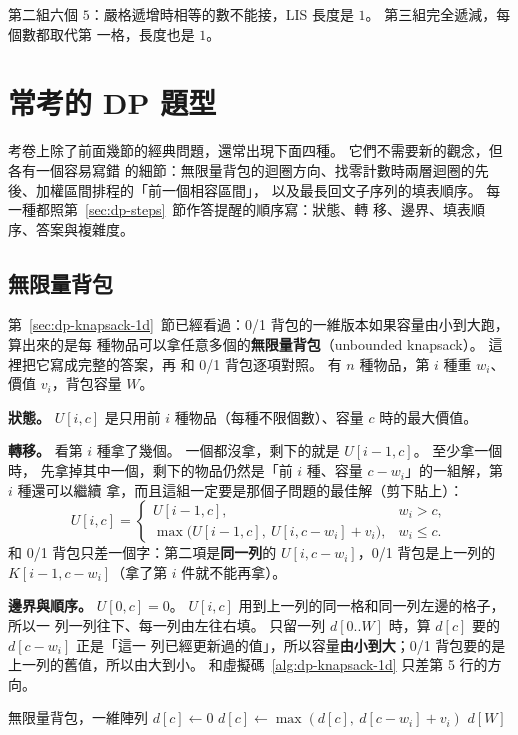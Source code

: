 第二組六個 $5$：嚴格遞增時相等的數不能接，LIS 長度是 $1$。 第三組完全遞減，每個數都取代第
一格，長度也是 $1$。

\section{常考的 DP 題型}
\label{sec:dp-classic}

考卷上除了前面幾節的經典問題，還常出現下面四種。 它們不需要新的觀念，但各有一個容易寫錯
的細節：無限量背包的迴圈方向、找零計數時兩層迴圈的先後、加權區間排程的「前一個相容區間」，
以及最長回文子序列的填表順序。 每一種都照第~\ref{sec:dp-steps}~節作答提醒的順序寫：狀態、轉
移、邊界、填表順序、答案與複雜度。

\subsection{無限量背包}
\label{sec:dp-unbounded}

第~\ref{sec:dp-knapsack-1d}~節已經看過：0/1 背包的一維版本如果容量由小到大跑，算出來的是每
種物品可以拿任意多個的\textbf{無限量背包}（unbounded knapsack）。 這裡把它寫成完整的答案，再
和 0/1 背包逐項對照。 有 $n$ 種物品，第 $i$ 種重 $w_i$、價值 $v_i$，背包容量 $W$。

\textbf{狀態。} $U[i, c]$ 是只用前 $i$ 種物品（每種不限個數）、容量 $c$ 時的最大價值。

\textbf{轉移。} 看第 $i$ 種拿了幾個。 一個都沒拿，剩下的就是 $U[i - 1, c]$。 至少拿一個時，
先拿掉其中一個，剩下的物品仍然是「前 $i$ 種、容量 $c - w_i$」的一組解，第 $i$ 種還可以繼續
拿，而且這組一定要是那個子問題的最佳解（剪下貼上）：
\[
U[i, c] = \begin{cases}
U[i - 1, c], & w_i > c, \\
\max\bigl(U[i - 1, c],\ U[i, c - w_i] + v_i\bigr), & w_i \le c .
\end{cases}
\]
和 0/1 背包只差一個字：第二項是\textbf{同一列}的 $U[i, c - w_i]$，0/1 背包是上一列的
$K[i - 1, c - w_i]$（拿了第 $i$ 件就不能再拿）。

\textbf{邊界與順序。} $U[0, c] = 0$。 $U[i, c]$ 用到上一列的同一格和同一列左邊的格子，所以一
列一列往下、每一列由左往右填。 只留一列 $d[0..W]$ 時，算 $d[c]$ 要的 $d[c - w_i]$ 正是「這一
列已經更新過的值」，所以容量\textbf{由小到大}；0/1 背包要的是上一列的舊值，所以由大到小。
 和虛擬碼~\ref{alg:dp-knapsack-1d} 只差第 5 行的方向。

\begin{pseudo}[label=alg:dp-unbounded]{無限量背包，一維陣列}
        \State $d[c] \gets 0$
    \EndFor
         
            \State $d[c] \gets \max(d[c],\ d[c - w_i] + v_i)$
        \EndFor
    \EndFor
    \State \Return $d[W]$
\EndFunction
\end{pseudo}


